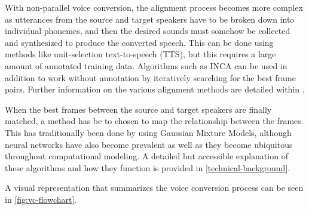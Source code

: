 \documentclass
[
    a4paper,
    twoside,
    12pt,
]
{report}
\begin{document}
With non-parallel voice conversion, the alignment process becomes more
complex as utterances from the source and target speakers have to be
broken down into individual phonemes, and then the desired sounds must
somehow be collected and synthesized to produce the converted speech.
This can be done using methods like unit-selection text-to-speech (TTS),
but this requires a large amount of annotated training data. Algorithms
such as INCA can be used in addition to work without annotation by
iteratively searching for the best frame pairs. Further information on
the various alignment methods are detailed within
\textcite{mohammadi2017}.

When the best frames between the source and target speakers are finally
matched, a method has be to chosen to map the relationship between the
frames. This has traditionally been done by using Gaussian Mixture
Models, although neural networks have also become prevalent as well as
they become ubiquitous throughout computational modeling. A detailed but
accessible explanation of these algorithms and how they function is
provided in \autoref{technical-background}.

A visual representation that summarizes the voice conversion process can
be seen in \autoref{fig:vc-flowchart}.
\end{document}
